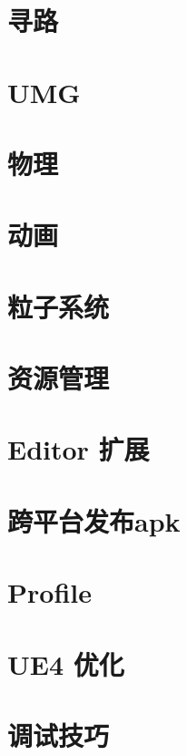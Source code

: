 \documentclass[UTF8,a4paper,12pt]{ctexbook}
\begin{document}
\chapter{寻路}
	
\chapter{UMG}
		
\chapter{物理}
		
\chapter{动画}
	
\chapter{粒子系统}
							
\chapter{资源管理}

\chapter{Editor 扩展}
		
\chapter{跨平台发布apk}

\chapter{Profile}
	
\chapter{UE4 优化}

\chapter{调试技巧}
	
	
	
	
	
\end{document}
